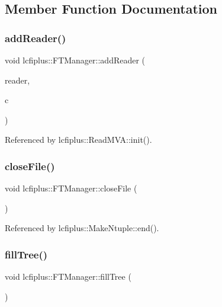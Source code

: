 \subsection{Member Function Documentation}
\mbox{\label{classlcfiplus_1_1FTManager_a5dd1e2351bc025b6e96f8233af8bed17}} 
\subsubsection{add\+Reader()}
{\footnotesize\ttfamily void lcfiplus\+::\+F\+T\+Manager\+::add\+Reader (\begin{DoxyParamCaption}\item[{T\+M\+V\+A\+::\+Reader $\ast$}]{reader,  }\item[{const \textbf{ Flavtag\+Category} \&}]{c }\end{DoxyParamCaption})}



Referenced by lcfiplus\+::\+Read\+M\+V\+A\+::init().

\mbox{\label{classlcfiplus_1_1FTManager_ada9310ab84f69d0a55268d908b4281ce}} 
\subsubsection{close\+File()}
{\footnotesize\ttfamily void lcfiplus\+::\+F\+T\+Manager\+::close\+File (\begin{DoxyParamCaption}{ }\end{DoxyParamCaption})}



Referenced by lcfiplus\+::\+Make\+Ntuple\+::end().

\mbox{\label{classlcfiplus_1_1FTManager_a49959b6f525f8803142e99144283bde4}} 
\subsubsection{fill\+Tree()}
{\footnotesize\ttfamily void lcfiplus\+::\+F\+T\+Manager\+::fill\+Tree (\begin{DoxyParamCaption}{ }\end{DoxyParamCaption})}



